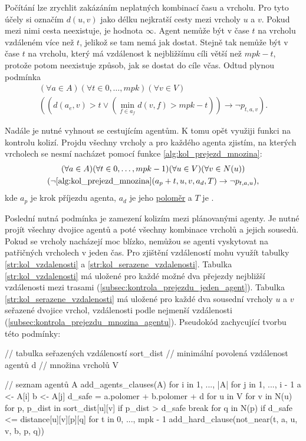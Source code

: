 Počítání lze zrychlit zakázáním neplatných kombinací času a vrcholu.
Pro tyto účely si označím $d(u, v)$ jako délku nejkratší cesty mezi vrcholy $u$ a $v$.
Pokud mezi nimi cesta neexistuje, je hodnota $\infty$.
Agent nemůže být v čase $t$ na vrcholu vzdáleném více než $t$, jelikož se tam nemá jak dostat.
Stejně tak nemůže být v čase $t$ na vrcholu, který má vzdálenost k nejbližšímu cíli větší než $mpk - t$,
protože potom neexistuje způsob, jak se dostat do cíle včas.
Odtud plynou podmínka
\begin{gather*}
(\forall a \in A)(\forall t \in {0, \dots, mpk})(\forall v \in V)
	\\
	((d(a_e, v) > t \vee (\min_{f \in a_f} d(v, f) > mpk - t)) \rightarrow \neg p_{t, a, v}).
\end{gather*}

Nadále je nutné vyhnout se cestujícím agentům.
K tomu opět využiji funkci na kontrolu kolizí.
Projdu všechny vrcholy a pro každého agenta zjistím,
na kterých vrcholech se nesmí nacházet pomocí funkce \ref{alg:kol_prejezd_mnozina}:
\begin{gather*}
	(\forall a \in A)(\forall t \in {0, \dots, mpk - 1})(\forall u \in V)(\forall v \in N(u)) \\
	(\neg \ref{alg:kol_prejezd_mnozina}(a_p + t, u, v, a_d, T) \rightarrow \neg p_{t, a, u}),
\end{gather*}
kde $a_p$ je krok příjezdu agenta, $a_d$ je jeho \hyperref[par:polomer_agenta]{poloměr}
a $T$ je .

Poslední nutná podmínka je zamezení kolizím mezi plánovanými agenty.
Je nutné projít všechny dvojice agentů a poté všechny kombinace vrcholů a jejich sousedů.
Pokud se vrcholy nacházejí moc blízko, nemůžou se agenti vyskytovat na patřičných vrcholech v jeden čas.
Pro zjištění vzdáleností mohu využít tabulky \ref{str:kol_vzdalenosti} a \ref{str:kol_serazene_vzdalenosti}.
Tabulka \ref{str:kol_vzdalenosti} má uložené pro každé možné dva přejezdy nejbližší vzdálenosti mezi trasami
(\ref{subsec:kontrola_prejezdu_jeden_agent}).
Tabulka \ref{str:kol_serazene_vzdalenosti} má uložené pro každé dva sousední vrcholy $u$ a $v$
seřazené dvojice vrchol, vzdálenosti podle nejmenší vzdálenosti (\ref{subsec:kontrola_prejezdu_mnozina_agentu}).
Pseudokód zachycující tvorbu této podmínky:

\begin{code}[fontsize=\footnotesize]
// tabulka seřazených vzdáleností sort_dist
// minimální povolená vzdálenost agentů d
// množina vrcholů V

// seznam agentů A
add_agents_clauses(A)
  for i in 1, ..., |A|
    for j in 1, ..., i - 1
      a <- A[i]
      b <- A[j]
      d_safe = a.polomer + b.polomer + d
      for u in V
        for v in N(u)
          for p, p_dist in sort_dist[u][v]
            if p_dist > d_safe
              break
            for q in N(p)
              if d_safe <= distance[u][v][p][q]
                for t in 0, ..., mpk - 1
                  add_hard_clause(not_near(t, a, u, v, b, p, q))
\end{code}

